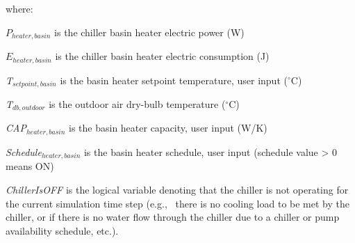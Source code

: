 where:

\({P_{heater,basin}}\) is the chiller basin heater electric power (W)

\({E_{heater,basin}}\) is the chiller basin heater electric consumption (J)

\emph{T\(_{setpoint,basin}\)} is the basin heater setpoint temperature, user input (\(^{\circ}\)C)

\emph{T\(_{db,outdoor}\)} is the outdoor air dry-bulb temperature (\(^{\circ}\)C)

\emph{CAP\(_{heater,basin}\)} is the basin heater capacity, user input (W/K)

\emph{Schedule\(_{heater,basin}\)} is the basin heater schedule, user input (schedule value \textgreater{} 0 means ON)

\emph{ChillerIsOFF} is the logical variable denoting that the chiller is not operating for the current simulation time step (e.g.,~ there is no cooling load to be met by the chiller, or if there is no water flow through the chiller due to a chiller or pump availability schedule, etc.). 
